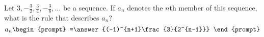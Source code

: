 \documentclass{ximera}
\author{Gregory Hartman \and Matthew Carr}
\begin{document}
\begin{exercise}



Let  $3,-\frac{3}{2},\frac{3}{4},-\frac{3}{8}, \ldots$ be a sequence. If $a_n$ denotes the $n$th member of this sequence, what is the rule that describes $a_n$?
\[
a_n
\begin{prompt}
=\answer{(-1)^{n+1}\frac{3}{2^{n-1}}}
\end{prompt}
\]

\end{exercise}
\end{document}
